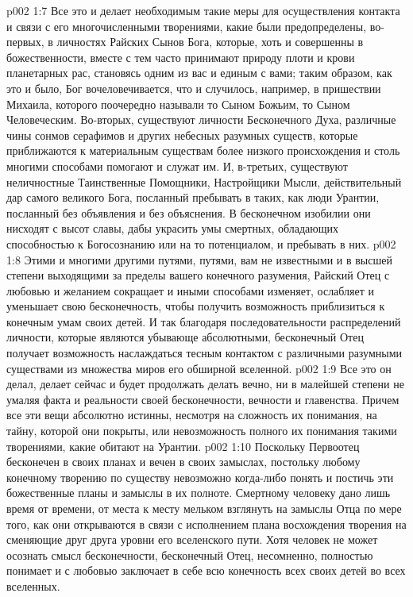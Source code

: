 \vs p002 1:7 Все это и делает необходимым такие меры для осуществления контакта и связи с его многочисленными творениями, какие были предопределены, во\hyp{}первых, в личностях Райских Сынов Бога, которые, хоть и совершенны в божественности, вместе с тем часто принимают природу плоти и крови планетарных рас, становясь одним из вас и единым с вами; таким образом, как это и было, Бог вочеловечивается, что и случилось, например, в пришествии Михаила, которого поочередно называли то Сыном Божьим, то Сыном Человеческим. Во\hyp{}вторых, существуют личности Бесконечного Духа, различные чины сонмов серафимов и других небесных разумных существ, которые приближаются к материальным существам более низкого происхождения и столь многими способами помогают и служат им. И, в\hyp{}третьих, существуют неличностные Таинственные Помощники, Настройщики Мысли, действительный дар самого великого Бога, посланный пребывать в таких, как люди Урантии, посланный без объявления и без объяснения. В бесконечном изобилии они нисходят с высот славы, дабы украсить умы смертных, обладающих способностью к Богосознанию или на то потенциалом, и пребывать в них.
\vs p002 1:8 Этими и многими другими путями, путями, вам не известными и в высшей степени выходящими за пределы вашего конечного разумения, Райский Отец с любовью и желанием сокращает и иными способами изменяет, ослабляет и уменьшает свою бесконечность, чтобы получить возможность приблизиться к конечным умам своих детей. И так благодаря последовательности распределений личности, которые являются убывающе абсолютными, бесконечный Отец получает возможность наслаждаться тесным контактом с различными разумными существами из множества миров его обширной вселенной.
\vs p002 1:9 Все это он делал, делает сейчас и будет продолжать делать вечно, ни в малейшей степени не умаляя факта и реальности своей бесконечности, вечности и главенства. Причем все эти вещи абсолютно истинны, несмотря на сложность их понимания, на тайну, которой они покрыты, или невозможность полного их понимания такими творениями, какие обитают на Урантии.
\vs p002 1:10 \pc Поскольку Первоотец бесконечен в своих планах и вечен в своих замыслах, постольку любому конечному творению по существу невозможно когда\hyp{}либо понять и постичь эти божественные планы и замыслы в их полноте. Смертному человеку дано лишь время от времени, от места к месту мельком взглянуть на замыслы Отца по мере того, как они открываются в связи с исполнением плана восхождения творения на сменяющие друг друга уровни его вселенского пути. Хотя человек не может осознать смысл бесконечности, бесконечный Отец, несомненно, полностью понимает и с любовью заключает в себе всю конечность всех своих детей во всех вселенных.
